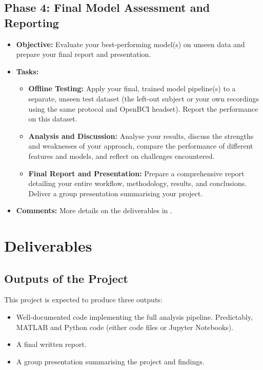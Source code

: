 \documentclass[11pt]{exam}
\begin{document}
    \subsection{Phase 4: Final Model Assessment and Reporting} %
    \begin{itemize}
        \item \textbf{Objective:} Evaluate your best-performing model(s) on unseen data and prepare your final report and presentation.
        \item \textbf{Tasks:}
        \begin{itemize}
            \item \textbf{Offline Testing:} Apply your final, trained model pipeline(s) to a separate, unseen test dataset (the left-out subject or your own recordings using the same protocol and OpenBCI headset). Report the performance on this dataset.
            \item \textbf{Analysis and Discussion:} Analyse your results, discuss the strengths and weaknesses of your approach, compare the performance of different features and models, and reflect on challenges encountered. %
            \item \textbf{Final Report and Presentation:} Prepare a comprehensive report detailing your entire workflow, methodology, results, and conclusions. Deliver a group presentation summarising your project. %
        \end{itemize}
        \item \textbf{Comments:} More details on the deliverables in .
    \end{itemize}

    \newpage
    \section{Deliverables}
    \label{sec:deliverables}

    \subsection{Outputs of the Project}
    This project is expected to produce three outputs:
    \begin{itemize}
        \item Well-documented code implementing the full analysis pipeline. Predictably, MATLAB and Python code (either code files or Jupyter Notebooks).
        \item A final written report.
        \item A group presentation summarising the project and findings. %
    \end{itemize}
\end{document}
